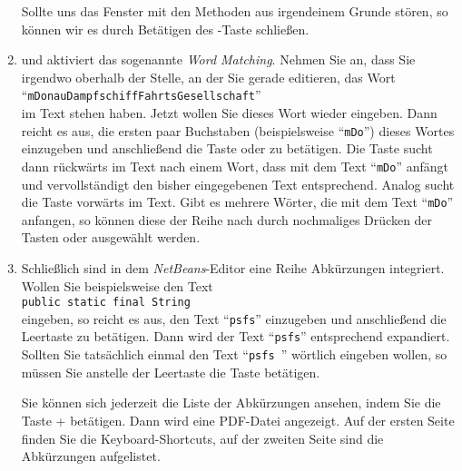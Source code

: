 \documentclass{article}
\begin{document}
\begin{enumerate}
      Sollte uns das Fenster mit den Methoden aus irgendeinem Grunde st\"oren, so k\"onnen wir
      es durch Bet\"atigen des -Taste schlie{\ss}en.
\item {} und  aktiviert das sogenannte
      \emph{Word Matching}.  Nehmen Sie an, dass Sie irgendwo oberhalb der Stelle, an der
      Sie gerade editieren, das Wort \\[0.1cm]
      \hspace*{1.3cm} ``\texttt{mDonauDampfschiffFahrtsGesellschaft}'' \\[0.1cm]
      im Text stehen haben.  Jetzt wollen Sie dieses Wort wieder eingeben.
      Dann reicht es  aus, die ersten paar Buchstaben (beispielsweise ``\texttt{mDo}'')
      dieses Wortes einzugeben und anschlie{\ss}end die Taste  oder
       zu bet\"atigen.   Die Taste  sucht dann r\"uckw\"arts im
      Text nach einem Wort, dass mit dem Text ``\texttt{mDo}'' anf\"angt und vervollst\"andigt
      den bisher eingegebenen Text entsprechend.  Analog sucht die Taste 
      vorw\"arts im Text.  Gibt es mehrere W\"orter, die mit dem Text ``\texttt{mDo}''
      anfangen, so k\"onnen diese der Reihe nach durch nochmaliges Dr\"ucken der Tasten 
       oder  ausgew\"ahlt werden.
\item Schlie{\ss}lich sind in dem \textsl{NetBeans}-Editor eine Reihe Abk\"urzungen integriert.
      Wollen Sie beispielsweise den Text \\[0.1cm]
      \hspace*{1.3cm} \texttt{public static final String}\\[0.1cm]
      eingeben, so reicht es aus, den Text ``\texttt{psfs}'' einzugeben und anschlie{\ss}end
      die Leertaste zu bet\"atigen.  Dann wird der Text ``\texttt{psfs}'' entsprechend
      expandiert.  Sollten Sie tats\"achlich einmal den Text ``\texttt{psfs }'' w\"ortlich
      eingeben wollen, so m\"ussen Sie anstelle der Leertaste die Taste
       bet\"atigen.

      Sie k\"onnen sich jederzeit die Liste der Abk\"urzungen ansehen, indem Sie 
      die Taste + bet\"atigen.
      Dann wird eine PDF-Datei angezeigt. Auf der ersten Seite finden Sie die
      Keyboard-Shortcuts, auf der zweiten Seite sind die Abk\"urzungen aufgelistet. 
\end{enumerate}
\end{document}
